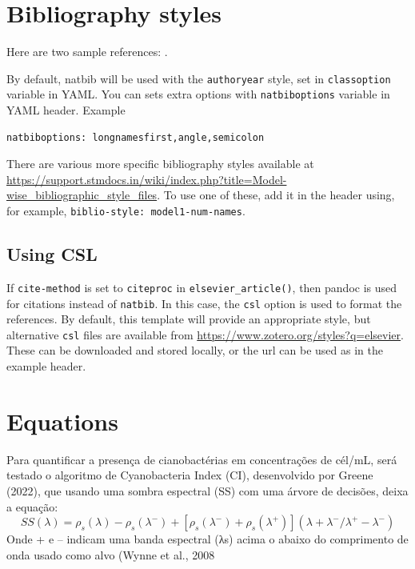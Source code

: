 \documentclass[
  super,
  preprint,
  3p]{elsarticle}
\begin{document}
\hypertarget{bibliography-styles}{%
\section{Bibliography styles}\label{bibliography-styles}}

Here are two sample references: \citet{Feynman1963118}
\citet{Dirac1953888}.

By default, natbib will be used with the \texttt{authoryear} style, set
in \texttt{classoption} variable in YAML. You can sets extra options
with \texttt{natbiboptions} variable in YAML header. Example

\begin{verbatim}
natbiboptions: longnamesfirst,angle,semicolon
\end{verbatim}

There are various more specific bibliography styles available at
\url{https://support.stmdocs.in/wiki/index.php?title=Model-wise_bibliographic_style_files}.
To use one of these, add it in the header using, for example,
\texttt{biblio-style:\ model1-num-names}.

\hypertarget{using-csl}{%
\subsection{Using CSL}\label{using-csl}}

If \texttt{cite-method} is set to \texttt{citeproc} in
\texttt{elsevier\_article()}, then pandoc is used for citations instead
of \texttt{natbib}. In this case, the \texttt{csl} option is used to
format the references. By default, this template will provide an
appropriate style, but alternative \texttt{csl} files are available from
\url{https://www.zotero.org/styles?q=elsevier}. These can be downloaded
and stored locally, or the url can be used as in the example header.

\hypertarget{equations}{%
\section{Equations}\label{equations}}

Para quantificar a presença de cianobactérias em concentrações de
cél/mL, será testado o algoritmo de Cyanobacteria Index (CI),
desenvolvido por Greene (2022), que usando uma sombra espectral (SS) com
uma árvore de decisões, deixa a equação: \[
SS(λ)= ρ_s (λ)-ρ_s (λ^- )+[ρ_s (λ^- )+ ρ_s (λ^+ )]  (λ+λ^-/λ^+ -λ^- )  
\] Onde + e -- indicam uma banda espectral (λs) acima o abaixo do
comprimento de onda usado como alvo (Wynne et al., 2008
\end{document}
